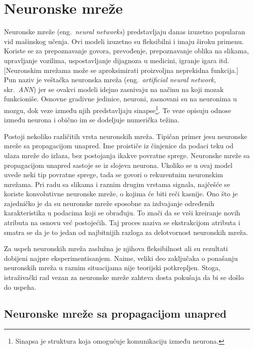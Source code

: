\chapter{Neuronske mreže}
\label{ch:nn}

Neuronske mreže (eng.~{\em neural networks}) predstavljaju danas izuzetno popularan vid mašinskog učenja. Ovi modeli izuzetno su fleksibilni i imaju široku primenu.  Koriste se za prepoznavanje govora, prevođenje, prepoznavanje oblika na slikama, upravljanje vozilima, uspostavljanje dijagnoza u medicini, igranje igara itd. [Neuronskim mrežama može se aproksimirati proizvoljna neprekidna funkcija.] Pun naziv je veštačka neuronska mreža (eng.~{\em artificial neural network}, skr.~{\em ANN}) jer se ovakvi modeli idejno zasnivaju na načinu na koji mozak funkcioniše. Osnovne gradivne jedinice, neuroni, zasnovani su na neuronima u mozgu, dok veze između njih predstavljaju sinapse\footnote{Sinapsa je struktura koja omogućuje komunikaciju između neurona.}. Te veze opisuju odnose između neurona i obično im se dodeljuje numerička težina.

\par
Postoji nekoliko različitih vrsta neuronskih mreža. Tipičan primer jesu neuronske mreže sa propagacijom unapred. Ime proističe iz činjenice da podaci teku od ulaza mreže do izlaza, bez postojanja ikakve povratne sprege. Neuronske mreže sa propagacijom unapred sastoje se iz slojeva neurona. Ukoliko se u ovaj model uvede neki tip povratne sprege, tada se govori o rekurentnim neuronskim mrežama. Pri radu sa slikama i raznim drugim vrstama signala, najčešće se koriste konvolutivne neuronske mreže, o kojima će biti reči kasnije. Ono što je zajedničko je da su neuronske mreže sposobne za izdvajanje određenih karakteristika u podacima koji se obrađuju. To znači da se vrši kreiranje novih atributa na osnovu već postojećih. Taj proces naziva se ekstrakcijom atributa i smatra se da je to jedan od najbitnijih razloga za delotvornost neuronskih mreža.
\par
Za uspeh neuronskih mreža zaslužna je njihova fleksibilnost ali su rezultati dobijeni najpre eksperimentisanjem. Naime, veliki deo zaključaka o ponašanju neuronskih mreža u raznim situacijama nije teorijski potkrepljen. Stoga, istraživački rad vezan za neuronske mreže zahteva dosta pokušaja da bi se došlo do uspeha.

\section{Neuronske mreže sa propagacijom unapred}

